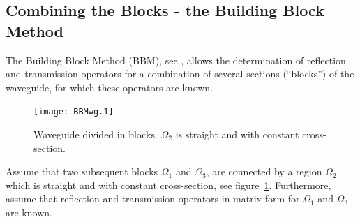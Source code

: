 \documentclass{kluwer}
\renewcommand{\Lambda}{\varLambda}
\renewcommand{\Lambda}{\varLambda}
\begin{document}
\begin{article}


\section{Combining the Blocks - the Building Block Method}
\label{sec:comb-blocks-build}

The Building Block Method (BBM), see \cite{nilssonbrander1981b},
allows the determination of reflection and transmission operators for
a combination of several sections (``blocks'') of the waveguide, for
which these operators are known.  

\begin{figure}[htb]
  \centering
  \texttt{[image: BBMwg.1]}
  \caption{Waveguide divided in blocks. $\Omega_2$ is straight and
    with constant cross-section.}
  \label{fig:wg4}
\end{figure}


Assume that two subsequent blocks $\Omega_1$ and $\Omega_3$, are
connected by a region $\Omega_2$ which is straight and with constant
cross-section, see figure~\ref{fig:wg4}. 
Furthermore, assume that
reflection and transmission operators in matrix form for $\Omega_1$
and $\Omega_3$ are known. 


\end{article}
\end{document}
